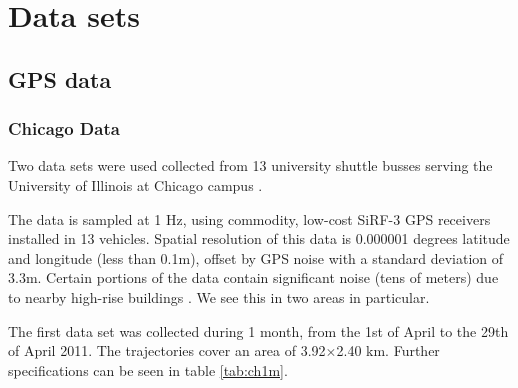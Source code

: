 \chapter{Data sets}
\label{chp:data}

\section{GPS data}
\label{chp:data.sec:gpsdata}

\subsection{Chicago Data}
\label{chp:data.sec:gpsdata.sec:chicago}

Two data sets were used collected from 13 university shuttle busses serving the University of Illinois at Chicago campus \citep{chicago}. 

The data is sampled at 1 Hz, using commodity, low-cost SiRF-3 GPS receivers installed in 13 vehicles. Spatial resolution of this data is 0.000001 degrees latitude and longitude (less than 0.1m), offset by GPS noise with a standard deviation of 3.3m. Certain portions of the data contain significant noise (tens of meters) due to nearby high-rise buildings \citep{4inBiagioni}. We see this in two areas in particular.

The first data set was collected during 1 month, from the 1st of April to the 29th of April 2011. The trajectories cover an area of 3.92$\times$2.40 km. Further specifications can be seen in table \ref{tab:ch1m}.



